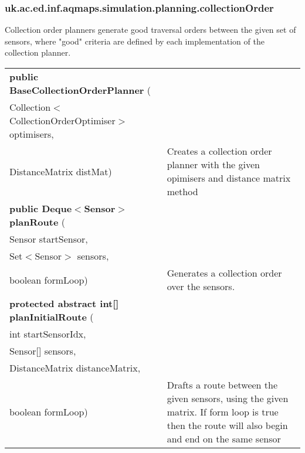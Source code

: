 \subsubsection{ uk.ac.ed.inf.aqmaps.simulation.planning.collectionOrder }
 { Collection order planners generate good traversal orders between the given set of sensors,\newline%
 where "good" criteria are defined by each implementation of the collection planner.
 
\begin{tabular}{ p{3in}|m{3.4in}}
\textbf{public BaseCollectionOrderPlanner } (\\ \hspace*{ 5pt} Collection$<$CollectionOrderOptimiser$>$ optimisers,\\\hspace*{ 5pt} DistanceMatrix distMat) & Creates a collection order planner with the given opimisers and distance matrix method\\ \hline 
\textbf{public Deque$<$Sensor$>$ planRoute } (\\ \hspace*{ 5pt} Sensor startSensor,\\\hspace*{ 5pt} Set$<$Sensor$>$ sensors,\\\hspace*{ 5pt} boolean formLoop) & Generates a collection order over the sensors.\\ \hline 
\textbf{protected abstract int{[}{]} planInitialRoute } (\\ \hspace*{ 5pt} int startSensorIdx,\\\hspace*{ 5pt} Sensor{[}{]} sensors,\\\hspace*{ 5pt} DistanceMatrix distanceMatrix,\\\hspace*{ 5pt} boolean formLoop) & Drafts a route between the given sensors, using the given matrix. If form loop is true then the route will also begin and end on the same sensor\\ \hline 
\end{tabular}
}
